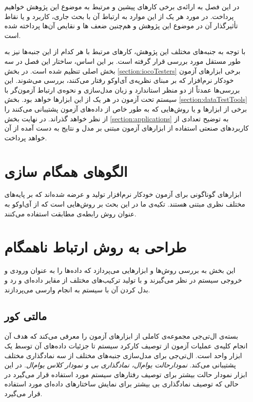 در این فصل به ارائه‌ی برخی کارهای پیشین و مرتبط به موضوع این پژوهش خواهیم پرداخت. در مورد هر یک از این موارد به ارتباط آن با بحث جاری، کاربرد و یا نقاط تأثیرگذار آن در موضوع این پژوهش و هم‌چنین ضعف ها و نقایص آن‌ها پرداخته شده است. 

با توجه به جنبه‌های مختلف این پژوهش، کارهای مرتبط با هر کدام از این جنبه‌ها نیز به طور مستقل مورد بررسی قرار گرفته است. بر این اساس، ساختار این فصل در سه بخش اصلی تنظیم شده است. در بخش \ref{section:iocoTesters} برخی ابزار‌های آزمون خودکار نرم‌افزار که بر مبنای نظریه‌ی آی‌او‌کو رفتار می‌کنند، بررسی می‌شوند. این بررسی‌ها عمدتاً از دو منظر استاندارد و زبان مدل‌سازی و نحوه‌ی ارتباط آزمون‌گر با سیستم تحت آزمون در هر یک از این ابزارها خواهد بود. بخش \ref{section:dataTestTools} برخی از ابزارها و یا روش‌هایی که به طور خاص از داده‌های آزمون پشتیبانی می‌کنند را از نظر خواهد گذراند. در نهایت بخش \ref{section:applications} به توضیح تعدادی از کاربردهای صنعتی استفاده از ابزارهای آزمون مبتنی بر مدل و نتایج به دست آمده از آن خواهد پرداخت. 

\section{الگوهای همگام سازی}
\label{section:coordinationPatterns}
ابزارهای گوناگونی برای آزمون خودکار نرم‌افزار تولید و عرضه شده‌اند که بر پایه‌های مختلف نظری مبتنی هستند. تکیه‌ی ما در این بحث بر روش‌هایی است که از آی‌اوکو به عنوان روش رابطه‌ی مطابقت استفاده می‌کنند. 
\section{طراحی به روش ارتباط ناهمگام}
\label{section:asyncDesign}
این بخش به بررسی روش‌ها و ابزارهایی می‌پردازد که داده‌‌ها را به عنوان ورودی و خروجی سیستم در نظر می‌گیرند و با تولید ترکیب‌های مختلف از مقایر داده‌ای و رد و بدل کردن آن با سیستم به انجام وارسی می‌پردازند.

\subsection{مالتی کور}
بسته‌ی ال‌تی‌جی \cite{Bouquet04LTG} مجموعه‌ی کاملی از ابزارهای آزمون را معرفی می‌کند که هدف آن انجام کلیه‌ی عملیات آزمون از توصیف کارکرد سیستم تا جزئیات داده‌های آن توسط یک ابزار واحد است. ال‌تی‌جی برای مدل‌سازی جنبه‌های مختلف از سه نمادگذاری مختلف پشتیبانی می‌کند. \textit{نمودارحالت یوام‌ال، نمادگذاری بی و نمودار کلاس یوام‌ال}. در این ابزار نمودار حالت بیشتر برای توصیف رفتارهای سیستم مورد استفاده قرار می‌گیرد در حالی که توصیف نمادگذاری بی بیشتر برای نمایش ساختارهای داده‌‌ای مورد استفاده قرار می‌گیرد. 

